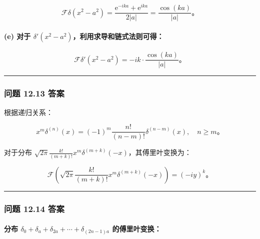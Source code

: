 $$
\mathcal{F}\delta(x^2-a^2) = \frac{\mathrm{e}^{-i k a} + \mathrm{e}^{i k a}}{2|a|} = \frac{\cos(k a)}{|a|}。
$$

\paragraph{\texorpdfstring{(e) 对于
$\delta'(x^2-a^2)$，利用求导和链式法则可得：}{(e) 对于 \textbackslash delta\textegsingle(x\^{}2-a\^{}2)，利用求导和链式法则可得：}}\label{e-ux5bf9ux4e8e-deltax2-a2ux5229ux7528ux6c42ux5bfcux548cux94feux5f0fux6cd5ux5219ux53efux5f97}

$$
\mathcal{F}\delta'(x^2-a^2) = -i k \cdot \frac{\cos(k a)}{|a|}。
$$

\begin{center}\rule{0.5\linewidth}{0.5pt}\end{center}

\subsubsection{问题 12.13 答案}\label{ux95eeux9898-12.13-ux7b54ux6848}

根据递归关系：

$$
x^m \delta^{(n)}(x) = (-1)^m \frac{n!}{(n-m)!} \delta^{(n-m)}(x), \quad n \geq m。
$$

对于分布
$\sqrt{2 \pi} \frac{k!}{(m+k)!} x^m \delta^{(m+k)}(-x)$，其傅里叶变换为：

$$
\mathcal{F}\left(\sqrt{2 \pi} \frac{k!}{(m+k)!} x^m \delta^{(m+k)}(-x)\right) = (-i y)^k。
$$

\begin{center}\rule{0.5\linewidth}{0.5pt}\end{center}

\subsubsection{问题 12.14 答案}\label{ux95eeux9898-12.14-ux7b54ux6848}

\paragraph{\texorpdfstring{分布
$\delta_{0} + \delta_{a} + \delta_{2a} + \cdots + \delta_{(2n-1)a}$
的傅里叶变换：}{分布 \textbackslash delta\_\{0\} + \textbackslash delta\_\{a\} + \textbackslash delta\_\{2a\} + \textbackslash cdots + \textbackslash delta\_\{(2n-1)a\} 的傅里叶变换：}}\label{ux5206ux5e03-delta_0-delta_a-delta_2a-cdots-delta_2n-1a-ux7684ux5085ux91ccux53f6ux53d8ux6362}

